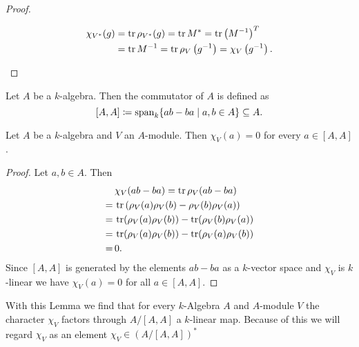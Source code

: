 \begin{proof}
\begin{enumerate}[label=\emph{\alph*})]
   \begin{align*}
    \chi_{V^*}(g)
    &= \operatorname{tr} \rho_{V^*}(g)
    = \operatorname{tr} M^*
    = \operatorname{tr} \left(M^{-1}\right)^T \\
    &= \operatorname{tr} M^{-1}
    = \operatorname{tr} \rho_V\left( g^{-1} \right)
    = \chi_V\left( g^{-1} \right).
   \end{align*}
 \end{enumerate}
\end{proof}


\begin{defi}
 Let $A$ be a $k$-algebra. Then the commutator of $A$ is defined as
 \[
  [A,A] \coloneqq \operatorname{span}_k \{ab-ba \mid a,b \in A\} \subseteq A.
 \]
\end{defi}


\begin{lem}
 Let $A$ be a $k$-algebra and $V$ an $A$-module. Then $\chi_V(a) = 0$ for every $a \in [A,A]$.
\end{lem}
\begin{proof}
 Let $a, b \in A$. Then
 \begin{align*}
   &\, \chi_V(ab-ba)
  =    \operatorname{tr} \rho_V(ab-ba) \\
  =&\, \operatorname{tr}\left( \rho_V(a)\rho_V(b)-\rho_V(b)\rho_V(a) \right) \\
  =&\, \operatorname{tr}(\rho_V(a)\rho_V(b)) - \operatorname{tr}(\rho_V(b)\rho_V(a)) \\
  =&\, \operatorname{tr}(\rho_V(a)\rho_V(b)) - \operatorname{tr}(\rho_V(a)\rho_V(b)) \\
  =&\, 0.
 \end{align*}
 Since $[A,A]$ is generated by the elements $ab-ba$ as a $k$-vector space and $\chi_V$ is $k$-linear we have $\chi_V(a) = 0$ for all $a \in [A,A]$.
\end{proof}


With this Lemma we find that for every $k$-Algebra $A$ and $A$-module $V$ the character $\chi_V$ factors through $A/[A,A]$ a $k$-linear map. Because of this we will regard $\chi_V$ as an element $\chi_V \in (A/[A,A])^*$











































